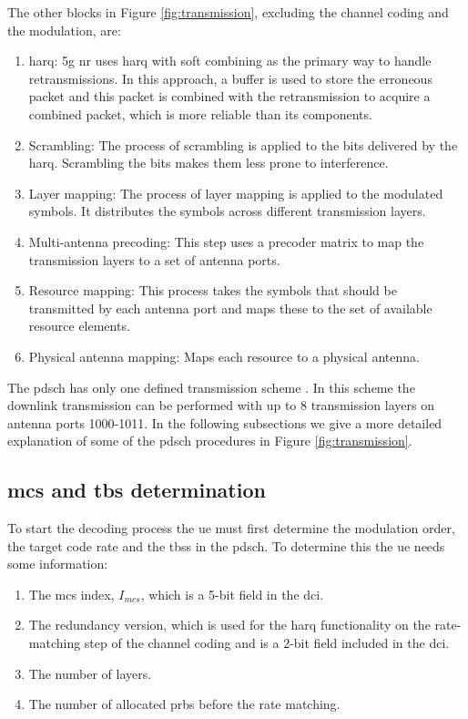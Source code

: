The other blocks in Figure \ref{fig:transmission}, excluding the channel coding and the modulation, are:
\begin{enumerate}
	\item \Gls{harq}: \gls{5g} \gls{nr} uses \gls{harq} with soft combining as the primary way to handle retransmissions. In this approach, a buffer is used to store the erroneous packet and this packet is combined with the retransmission to acquire a combined packet, which is more reliable than its components.
	\item Scrambling: The process of scrambling is applied to the bits delivered by the \gls{harq}. Scrambling the bits makes them less prone to interference.
	\item Layer mapping: The process of layer mapping is applied to the modulated symbols. It distributes the symbols across different transmission layers.
	\item Multi-antenna precoding: This step uses a precoder matrix to map the transmission layers to a set of antenna ports.
	\item Resource mapping: This process takes the symbols that should be transmitted by each antenna port and maps these to the set of available resource elements.
	\item Physical antenna mapping: Maps each resource to a physical antenna.
\end{enumerate}

The \gls{pdsch} has only one defined transmission scheme \cite{3gpp.38.214}.
%
In this scheme the downlink transmission can be performed with up to 8 transmission layers on antenna ports 1000-1011.
%
In the following subsections we give a more detailed explanation of some of the \gls{pdsch} procedures in Figure \ref{fig:transmission}.

\subsection{\Acl{mcs} and \acl{tbs} determination}

To start the decoding process the \gls{ue} must first determine the modulation order, the target code rate and the \glspl{tbs} in the \gls{pdsch}.
%
To determine this the \gls{ue} needs some information:

\begin{enumerate}
    \item The \gls{mcs} index, $I_{mcs}$, which is a 5-bit field in the \gls{dci}.
    \item The redundancy version, which is used for the \gls{harq} functionality on the rate-matching step of the channel coding and is a 2-bit field included in the \gls{dci}.
    \item The number of layers.
    \item The number of allocated \glspl{prb} before the rate matching.
\end{enumerate}

